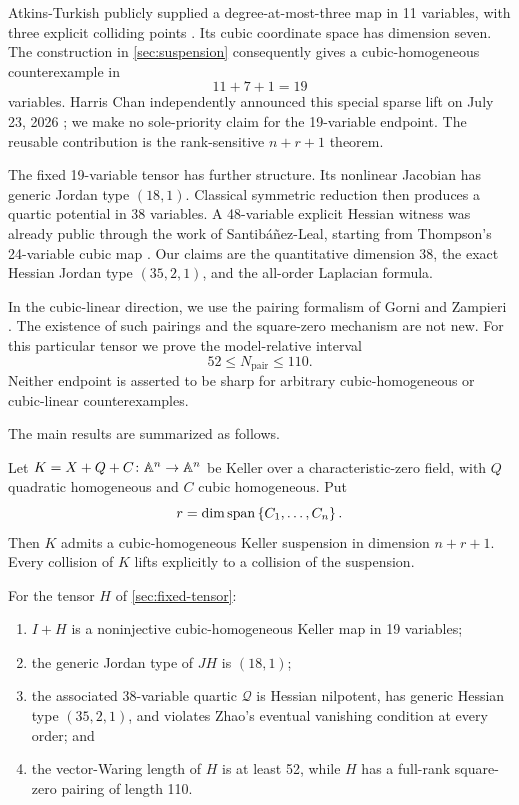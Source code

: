 \documentclass[11pt,reqno]{amsart}
\begin{document}
Atkins-Turkish publicly supplied a degree-at-most-three map in 11 variables,
with three explicit colliding points \cite{atkinsTurkish2026}.  Its cubic
coordinate space has dimension seven.  The construction in
\cref{sec:suspension} consequently gives a cubic-homogeneous counterexample
in
\[
11+7+1=19
\]
variables.  Harris Chan independently announced this special sparse lift on
July 23, 2026 \cite{chan2026nineteen}; we make no sole-priority claim for the
19-variable endpoint.  The reusable contribution is the rank-sensitive
\(n+r+1\) theorem.

The fixed 19-variable tensor has further structure.  Its nonlinear Jacobian
has generic Jordan type \((18,1)\).  Classical symmetric reduction
\cite{deBondtVanDenEssen2005symmetric} then produces a quartic potential in
38 variables.  A 48-variable explicit Hessian witness was already public
through the work of Santibáñez-Leal, starting from Thompson's 24-variable
cubic map \cite{thompson2026twentyfour,santibanezLeal2026cascade}.  Our
claims are the quantitative dimension 38, the exact Hessian Jordan type
\((35,2,1)\), and the all-order Laplacian formula.

In the cubic-linear direction, we use the pairing formalism of Gorni and
Zampieri \cite{gorniZampieri1997}.  The existence of such pairings and the
square-zero mechanism are not new.  For this particular tensor we prove the
model-relative interval
\[
52\le N_{\mathrm{pair}}\le110.
\]
Neither endpoint is asserted to be sharp for arbitrary cubic-homogeneous or
cubic-linear counterexamples.

The main results are summarized as follows.

\begin{theorem}
\label{thm:intro-suspension}
Let \(K=X+Q+C\colon\mathbb A^n\to\mathbb A^n\) be Keller over a characteristic-zero
field, with \(Q\) quadratic homogeneous and \(C\) cubic homogeneous.  Put
\[
r=\dim\operatorname{span}\left\{C_1,\ldots,C_n\right\}.
\]
Then \(K\) admits a cubic-homogeneous Keller suspension in dimension
\(n+r+1\).  Every collision of \(K\) lifts explicitly to a collision of the
suspension.
\end{theorem}

\begin{theorem}
\label{thm:intro-fixed}
For the tensor \(H\) of \cref{sec:fixed-tensor}:
\begin{enumerate}[label=(\roman*)]
\item \(I+H\) is a noninjective cubic-homogeneous Keller map in 19 variables;
\item the generic Jordan type of \(JH\) is \((18,1)\);
\item the associated 38-variable quartic \(\mathcal Q\) is Hessian nilpotent,
has generic Hessian type \((35,2,1)\), and violates Zhao's eventual
vanishing condition at every order; and
\item the vector-Waring length of \(H\) is at least 52, while \(H\) has a
full-rank square-zero pairing of length 110.
\end{enumerate}
\end{theorem}
\end{document}
